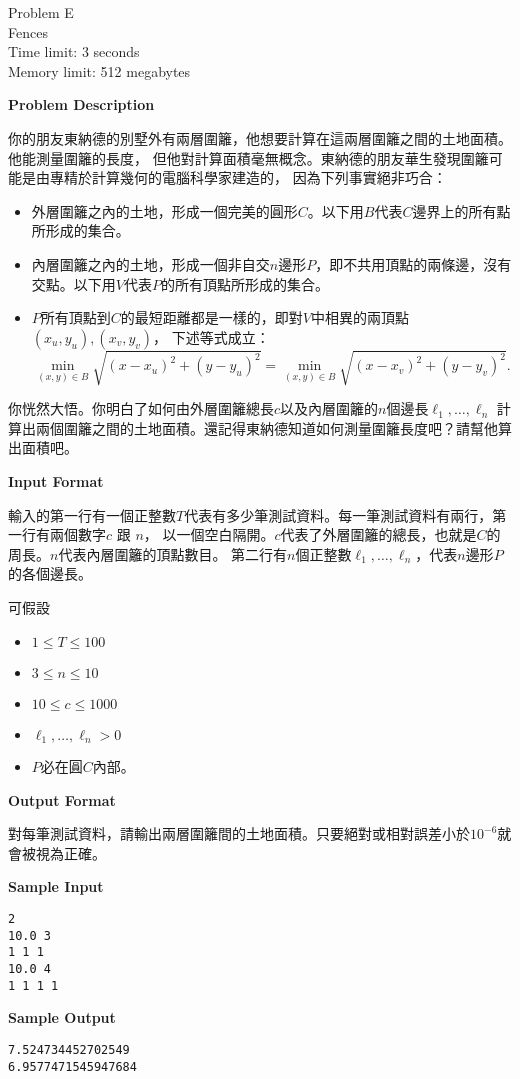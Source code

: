 \begin{center}
    {\LARGE Problem E}\vspace{1mm}\\
    {\Large Fences}\\
    {Time limit: 3 seconds}\\
    {Memory limit: 512 megabytes}
\end{center}

\textbf{\large Problem Description}

你的朋友東納德的別墅外有兩層圍籬，他想要計算在這兩層圍籬之間的土地面積。他能測量圍籬的長度，
但他對計算面積毫無概念。東納德的朋友華生發現圍籬可能是由專精於計算幾何的電腦科學家建造的，
因為下列事實絕非巧合：
\begin{itemize}
\item 外層圍籬之內的土地，形成一個完美的圓形$C$。以下用$B$代表$C$邊界上的所有點所形成的集合。
\item 內層圍籬之內的土地，形成一個非自交$n$邊形$P$，即不共用頂點的兩條邊，沒有交點。以下用$V$代表$P$的所有頂點所形成的集合。
\item $P$所有頂點到$C$的最短距離都是一樣的，即對$V$中相異的兩頂點$(x_u,y_u),(x_v,y_v)$，
下述等式成立：
$$\min_{(x,y)\in B}\sqrt{(x-x_u)^2+(y-y_u)^2}=\min_{(x,y)\in B}\sqrt{(x-x_v)^2+(y-y_v)^2}.$$
\end{itemize}
你恍然大悟。你明白了如何由外層圍籬總長$c$以及內層圍籬的$n$個邊長$\ell_1,\dots,\ell_n$
計算出兩個圍籬之間的土地面積。還記得東納德知道如何測量圍籬長度吧？請幫他算出面積吧。

\textbf{\large Input Format}

輸入的第一行有一個正整數$T$代表有多少筆測試資料。每一筆測試資料有兩行，第一行有兩個數字$c$ 跟 $n$，
以一個空白隔開。$c$代表了外層圍籬的總長，也就是$C$的周長。$n$代表內層圍籬的頂點數目。
第二行有$n$個正整數$\ell_1,\dots,\ell_n$，代表$n$邊形$P$的各個邊長。

可假設
\begin{itemize}
    \tightlist{}
    \item $1 \le T \le 100$
    \item $3 \le n \le 10$
    \item $10 \le c \le 1000$
    \item $\ell_1,\dots,\ell_n>0$
    \item $P$必在圓$C$內部。
\end{itemize}

\textbf{\large Output Format}

對每筆測試資料，請輸出兩層圍籬間的土地面積。只要絕對或相對誤差小於$10^{-6}$就會被視為正確。

\textbf{\large Sample Input}

\begin{verbatim}
2
10.0 3
1 1 1
10.0 4
1 1 1 1
\end{verbatim}

\textbf{\large Sample Output}

\begin{verbatim}
7.524734452702549
6.9577471545947684
\end{verbatim}
